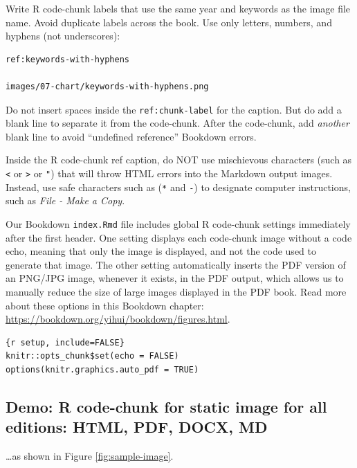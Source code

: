 \documentclass[
  english,
]{book}
\begin{document}
Write R code-chunk labels that use the same year and keywords as the image file name. Avoid duplicate labels across the book. Use only letters, numbers, and hyphens (not underscores):

\begin{verbatim}
ref:keywords-with-hyphens

images/07-chart/keywords-with-hyphens.png
\end{verbatim}

Do not insert spaces inside the \texttt{ref:chunk-label} for the caption. But do add a blank line to separate it from the code-chunk. After the code-chunk, add \emph{another} blank line to avoid ``undefined reference'' Bookdown errors.

Inside the R code-chunk ref caption, do NOT use mischievous characters (such as \texttt{\textless{}} or \texttt{\textgreater{}} or \texttt{"}) that will throw HTML errors into the Markdown output images. Instead, use safe characters such as (\texttt{*} and \texttt{-}) to designate computer instructions, such as \emph{File - Make a Copy}.

Our Bookdown \texttt{index.Rmd} file includes global R code-chunk settings immediately after the first header. One setting displays each code-chunk image without a code echo, meaning that only the image is displayed, and not the code used to generate that image. The other setting automatically inserts the PDF version of an PNG/JPG image, whenever it exists, in the PDF output, which allows us to manually reduce the size of large images displayed in the PDF book. Read more about these options in this Bookdown chapter: \url{https://bookdown.org/yihui/bookdown/figures.html}.

\begin{verbatim}
{r setup, include=FALSE}
knitr::opts_chunk$set(echo = FALSE)
options(knitr.graphics.auto_pdf = TRUE)
\end{verbatim}

\hypertarget{demo-r-code-chunk-for-static-image-for-all-editions-html-pdf-docx-md}{%
\subsection*{Demo: R code-chunk for static image for all editions: HTML, PDF, DOCX, MD}\label{demo-r-code-chunk-for-static-image-for-all-editions-html-pdf-docx-md}}

\ldots as shown in Figure \ref{fig:sample-image}.
\end{document}
